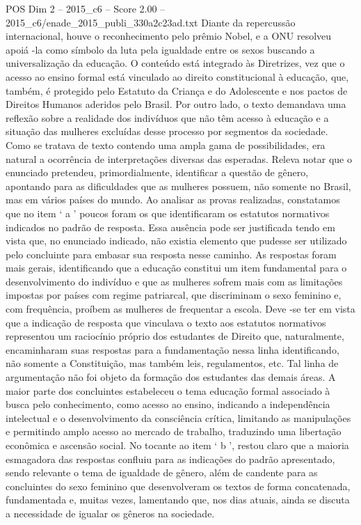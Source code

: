 \begin{textsample}{POS Dim 2 – 2015\_c6 – Score 2.00 – 2015\_c6/enade\_2015\_publi\_330a2c23ad.txt}
Diante da repercussão internacional, houve o reconhecimento pelo prêmio Nobel, e a ONU resolveu apoiá -la como símbolo da luta pela igualdade entre os sexos buscando a universalização da educação.
O conteúdo está integrado às Diretrizes, vez que o acesso ao ensino formal está vinculado ao direito constitucional à educação, que, também, é protegido pelo Estatuto da Criança e do Adolescente e nos pactos de Direitos Humanos aderidos pelo Brasil.
Por outro lado, o texto demandava uma reflexão sobre a realidade dos indivíduos que não têm acesso à educação e a situação das mulheres excluídas desse processo por segmentos da sociedade.
Como se tratava de texto contendo uma ampla gama de possibilidades, era natural a ocorrência de interpretações diversas das esperadas.
Releva notar que o enunciado pretendeu, primordialmente, identificar a questão de gênero, apontando para as dificuldades que as mulheres possuem, não somente no Brasil, mas em vários países do mundo.
Ao analisar as provas realizadas, constatamos que no item ‘ a ’ poucos foram os que identificaram os estatutos normativos indicados no padrão de resposta.
Essa ausência pode ser justificada tendo em vista que, no enunciado indicado, não existia elemento que pudesse ser utilizado pelo concluinte para embasar sua resposta nesse caminho.
As respostas foram mais gerais, identificando que a educação constitui um item fundamental para o desenvolvimento do indivíduo e que as mulheres sofrem mais com as limitações impostas por países com regime patriarcal, que discriminam o sexo feminino e, com frequência, proíbem as mulheres de frequentar a escola.
Deve -se ter em vista que a indicação de resposta que vinculava o texto aos estatutos normativos representou um raciocínio próprio dos estudantes de Direito que, naturalmente, encaminharam suas respostas para a fundamentação nessa linha identificando, não somente a Constituição, mas também leis, regulamentos, etc.
Tal linha de argumentação não foi objeto da formação dos estudantes das demais áreas.
A maior parte dos concluintes estabeleceu o tema educação formal associado à busca pelo conhecimento, como acesso ao ensino, indicando a independência intelectual e o desenvolvimento da consciência crítica, limitando as manipulações e permitindo amplo acesso ao mercado de trabalho, traduzindo uma libertação econômica e ascensão social.
No tocante ao item ‘ b ’, restou claro que a maioria esmagadora das respostas confluiu para as indicações do padrão apresentado, sendo relevante o tema de igualdade de gênero, além de candente para as concluintes do sexo feminino que desenvolveram os textos de forma concatenada, fundamentada e, muitas vezes, lamentando que, nos dias atuais, ainda se discuta a necessidade de igualar os gêneros na sociedade.

\end{textsample}
